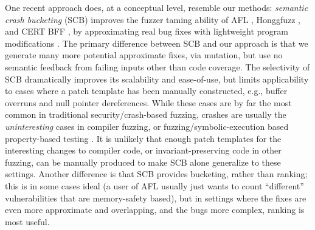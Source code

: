 One recent approach does, at a conceptual level, resemble our methods:  \emph{semantic crash bucketing} (SCB) improves the fuzzer taming ability of AFL \cite{aflfuzz}, Honggfuzz \cite{honggfuzz}, and CERT BFF \cite{BFF}, by approximating real bug fixes with lightweight program modifications \cite{SCB}.  The primary difference between SCB and our approach is that we generate many more potential approximate fixes, via mutation, but use no semantic feedback from failing inputs other than code coverage.  The selectivity of SCB dramatically improves its scalability and ease-of-use, but limits applicability to cases where a patch template has been manually constructed, e.g., buffer overruns and null pointer dereferences.  While these cases are by far the most common in traditional security/crash-based fuzzing, crashes are usually the \emph{uninteresting} cases in compiler fuzzing, or fuzzing/symbolic-execution based property-based \cite{ClaessenH00} testing \cite{DeepState,DeepStateTutorial,deepstaterepo}.  It is unlikely that enough patch templates for the interesting changes to compiler code, or invariant-preserving code in other fuzzing, can be manually produced to make SCB alone generalize to these settings.  Another difference is that SCB provides bucketing, rather than ranking; this is in some cases ideal (a user of AFL usually just wants to count ``different'' vulnerabilities that are memory-safety based), but in settings where the fixes are even more approximate and overlapping, and the bugs more complex, ranking is most useful.  

